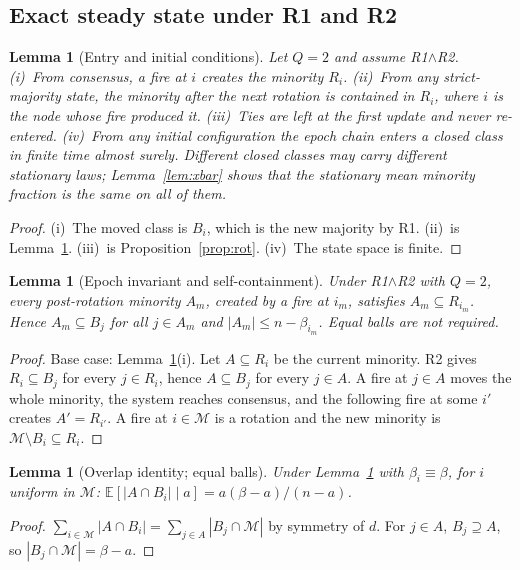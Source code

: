 \documentclass[aps,pre,onecolumn,superscriptaddress,amsmath,amssymb,longbibliography]{revtex4-2}
\newtheorem{lemma}[theorem]{Lemma}
\theoremstyle{definition}
\theoremstyle{remark}
\newcommand{\E}{\mathbb{E}}
\begin{document}
\subsection{Exact steady state under R1 and R2}

\begin{lemma}[Entry and initial conditions]
\label{lem:entry}
Let $Q=2$ and assume R1$\wedge$R2. (i)~From consensus, a fire at $i$
creates the minority $R_i$. (ii)~From any strict-majority state, the
minority after the next rotation is contained in $R_i$, where $i$ is the
node whose fire produced it. (iii)~Ties are left at the first update and
never re-entered. (iv)~From any initial configuration the epoch chain
enters a closed class in finite time almost surely. Different closed
classes may carry different stationary laws; Lemma~\ref{lem:xbar} shows
that the stationary mean minority fraction is the same on all of them.
\end{lemma}
\begin{proof}
(i)~The moved class is $B_i$, which is the new majority by R1. (ii)~is
Lemma~\ref{lem:epoch}. (iii)~is Proposition~\ref{prop:rot}. (iv)~The
state space is finite.
\end{proof}

\begin{lemma}[Epoch invariant and self-containment]
\label{lem:epoch}
Under R1$\wedge$R2 with $Q=2$, every post-rotation minority $A_m$,
created by a fire at $i_m$, satisfies $A_m\subseteq R_{i_m}$. Hence
$A_m\subseteq B_j$ for all $j\in A_m$ and $|A_m|\le n-\beta_{i_m}$.
Equal balls are not required.
\end{lemma}
\begin{proof}
Base case: Lemma~\ref{lem:entry}(i). Let $A\subseteq R_i$ be the current
minority. R2 gives $R_i\subseteq B_j$ for every $j\in R_i$, hence
$A\subseteq B_j$ for every $j\in A$. A fire at $j\in A$ moves the whole
minority, the system reaches consensus, and the following fire at some
$i'$ creates $A'=R_{i'}$. A fire at $i\in\mathcal M$ is a rotation and the
new minority is $\mathcal M\setminus B_i\subseteq R_i$.
\end{proof}

\begin{lemma}[Overlap identity; equal balls]
\label{lem:overlap}
Under Lemma~\ref{lem:epoch} with $\beta_i\equiv\beta$, for $i$ uniform in
$\mathcal M$: $\E[|A\cap B_i|\mid a]=a(\beta-a)/(n-a)$.
\end{lemma}
\begin{proof}
$\sum_{i\in\mathcal M}|A\cap B_i|=\sum_{j\in A}|B_j\cap\mathcal M|$ by
symmetry of $d$. For $j\in A$, $B_j\supseteq A$, so
$|B_j\cap\mathcal M|=\beta-a$.
\end{proof}
\end{document}
